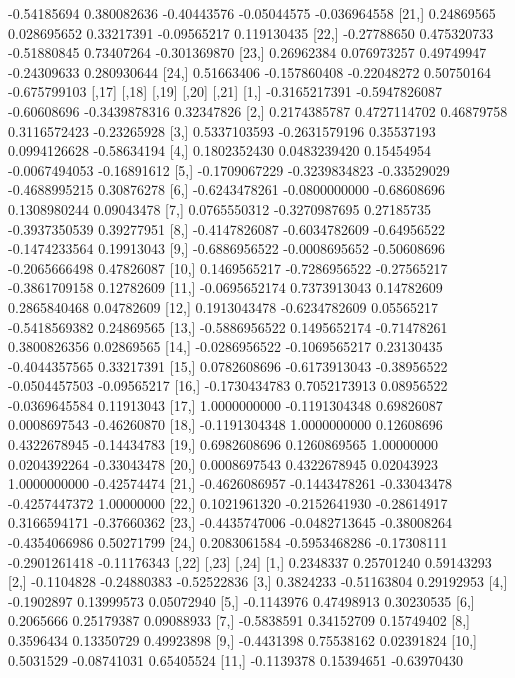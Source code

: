\documentclass[a4paper, 12pt]{article}
\begin{document}
\begin{table}[H]
\begin{Schunk}
\begin{Soutput}
[20,] -0.54185694  0.380082636 -0.40443576 -0.05044575 -0.036964558
[21,]  0.24869565  0.028695652  0.33217391 -0.09565217  0.119130435
[22,] -0.27788650  0.475320733 -0.51880845  0.73407264 -0.301369870
[23,]  0.26962384  0.076973257  0.49749947 -0.24309633  0.280930644
[24,]  0.51663406 -0.157860408 -0.22048272  0.50750164 -0.675799103
              [,17]         [,18]       [,19]         [,20]       [,21]
 [1,] -0.3165217391 -0.5947826087 -0.60608696 -0.3439878316  0.32347826
 [2,]  0.2174385787  0.4727114702  0.46879758  0.3116572423 -0.23265928
 [3,]  0.5337103593 -0.2631579196  0.35537193  0.0994126628 -0.58634194
 [4,]  0.1802352430  0.0483239420  0.15454954 -0.0067494053 -0.16891612
 [5,] -0.1709067229 -0.3239834823 -0.33529029 -0.4688995215  0.30876278
 [6,] -0.6243478261 -0.0800000000 -0.68608696  0.1308980244  0.09043478
 [7,]  0.0765550312 -0.3270987695  0.27185735 -0.3937350539  0.39277951
 [8,] -0.4147826087 -0.6034782609 -0.64956522 -0.1474233564  0.19913043
 [9,] -0.6886956522 -0.0008695652 -0.50608696 -0.2065666498  0.47826087
[10,]  0.1469565217 -0.7286956522 -0.27565217 -0.3861709158  0.12782609
[11,] -0.0695652174  0.7373913043  0.14782609  0.2865840468  0.04782609
[12,]  0.1913043478 -0.6234782609  0.05565217 -0.5418569382  0.24869565
[13,] -0.5886956522  0.1495652174 -0.71478261  0.3800826356  0.02869565
[14,] -0.0286956522 -0.1069565217  0.23130435 -0.4044357565  0.33217391
[15,]  0.0782608696 -0.6173913043 -0.38956522 -0.0504457503 -0.09565217
[16,] -0.1730434783  0.7052173913  0.08956522 -0.0369645584  0.11913043
[17,]  1.0000000000 -0.1191304348  0.69826087  0.0008697543 -0.46260870
[18,] -0.1191304348  1.0000000000  0.12608696  0.4322678945 -0.14434783
[19,]  0.6982608696  0.1260869565  1.00000000  0.0204392264 -0.33043478
[20,]  0.0008697543  0.4322678945  0.02043923  1.0000000000 -0.42574474
[21,] -0.4626086957 -0.1443478261 -0.33043478 -0.4257447372  1.00000000
[22,]  0.1021961320 -0.2152641930 -0.28614917  0.3166594171 -0.37660362
[23,] -0.4435747006 -0.0482713645 -0.38008264 -0.4354066986  0.50271799
[24,]  0.2083061584 -0.5953468286 -0.17308111 -0.2901261418 -0.11176343
           [,22]       [,23]       [,24]
 [1,]  0.2348337  0.25701240  0.59143293
 [2,] -0.1104828 -0.24880383 -0.52522836
 [3,]  0.3824233 -0.51163804  0.29192953
 [4,] -0.1902897  0.13999573  0.05072940
 [5,] -0.1143976  0.47498913  0.30230535
 [6,]  0.2065666  0.25179387  0.09088933
 [7,] -0.5838591  0.34152709  0.15749402
 [8,]  0.3596434  0.13350729  0.49923898
 [9,] -0.4431398  0.75538162  0.02391824
[10,]  0.5031529 -0.08741031  0.65405524
[11,] -0.1139378  0.15394651 -0.63970430

\end{Soutput}
\end{Schunk}
\end{table}
\end{document}
